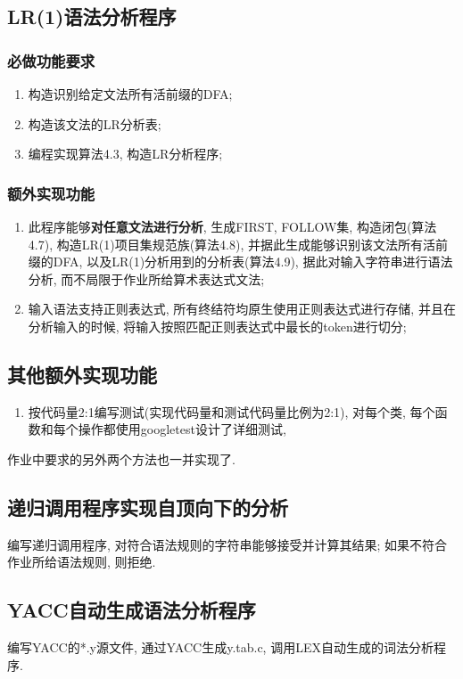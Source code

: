 \subsection{LR(1)语法分析程序}
\subsubsection{必做功能要求}
\begin{enumerate}
	\item 构造识别给定文法所有活前缀的DFA;
	\item 构造该文法的LR分析表;
	\item 编程实现算法4.3, 构造LR分析程序;
\end{enumerate}

\subsubsection{额外实现功能}
\begin{enumerate}
	\item 此程序能够\textbf{对任意文法进行分析}, 生成FIRST, FOLLOW集,
	      构造闭包(算法4.7), 构造LR(1)项目集规范族(算法4.8),
	      并据此生成能够识别该文法所有活前缀的DFA,
	      以及LR(1)分析用到的分析表(算法4.9),
	      据此对输入字符串进行语法分析, 而不局限于作业所给算术表达式文法;
	\item 输入语法支持正则表达式, 所有终结符均原生使用正则表达式进行存储,
	      并且在分析输入的时候, 将输入按照匹配正则表达式中最长的token进行切分;
\end{enumerate}

\subsection{其他额外实现功能}
\begin{enumerate}
	\item 按代码量2:1编写测试(实现代码量和测试代码量比例为2:1), 对每个类,
	      每个函数和每个操作都使用googletest设计了详细测试,
\end{enumerate}

作业中要求的另外两个方法也一并实现了.

\subsection{递归调用程序实现自顶向下的分析}
编写递归调用程序, 对符合语法规则的字符串能够接受并计算其结果;
如果不符合作业所给语法规则, 则拒绝.

\subsection{YACC自动生成语法分析程序}
编写YACC的*.y源文件, 通过YACC生成y.tab.c, 调用LEX自动生成的词法分析程序.
